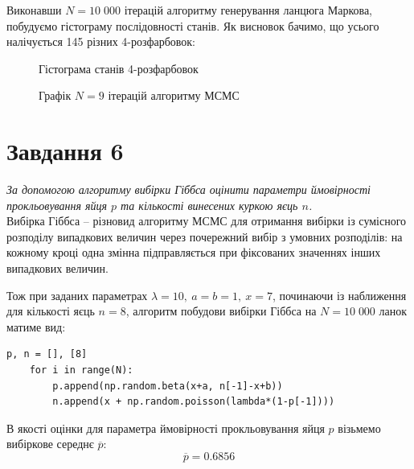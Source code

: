 \documentclass[a4paper,14pt]{extarticle} %
\numberwithin{equation}{section}
\begin{document}
Виконавши $N=10\;000$ ітерацій алгоритму генерування ланцюга Маркова, побудуємо гістограму послідовності станів. Як висновок бачимо, що усього налічується 145 різних 4-розфарбовок: 

\begin{figure}[H]
    \caption{Гістограма станів 4-розфарбовок}
    \label{figure: task 5.6}
\end{figure}

\begin{figure}[H]
    \caption{Графік $N=9$ ітерацій алгоритму МСМС}
    \label{figure: task 5.5}
\end{figure}

\newpage
\section*{Завдання 6}

\textit{За допомогою алгоритму вибірки Гіббса оцінити параметри ймовірності прокльовування яйця $p$ та кількості винесених куркою яєць $n$.} \\

Вибірка Гіббса -- різновид алгоритму МСМС для отримання вибірки із сумісного розподілу випадкових величин через почережний вибір з умовних розподілів: на кожному кроці одна змінна підправляється при фіксованих значеннях інших випадкових величин.

Тож при заданих параметрах $\lambda=10,\ a=b=1,\ x=7$, починаючи із наближення для кількості яєць $n=8$, алгоритм побудови вибірки Гіббса на $N=10\;000$ ланок матиме вид:

\begin{lstlisting}[firstnumber=1, label = code: task 6, caption = Генерування вибірки Гіббса]
    p, n = [], [8]
    for i in range(N):
        p.append(np.random.beta(x+a, n[-1]-x+b))
        n.append(x + np.random.poisson(lambda*(1-p[-1])))
\end{lstlisting}

\vspace{0.4cm}
В якості оцінки для параметра ймовірності прокльовування яйця $p$ візьмемо вибіркове середнє $\overline{p}:$
\[ \overline{p}=0.6856 \]  
\end{document}
